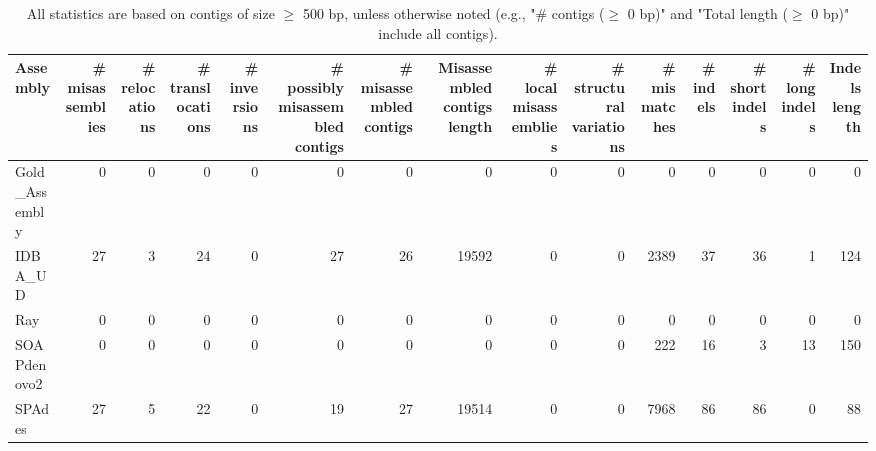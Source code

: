 \documentclass[12pt,a4paper]{article}
\begin{document}
\begin{table}[ht]
\begin{center}
\caption{All statistics are based on contigs of size $\geq$ 500 bp, unless otherwise noted (e.g., "\# contigs ($\geq$ 0 bp)" and "Total length ($\geq$ 0 bp)" include all contigs).}
\begin{tabular}{|l*{14}{|r}|}
\hline
Assembly & \# misassemblies &     \# relocations &     \# translocations &     \# inversions & \# possibly misassembled contigs & \# misassembled contigs & Misassembled contigs length & \# local misassemblies & \# structural variations & \# mismatches & \# indels &     \# short indels &     \# long indels & Indels length \\ \hline
Gold\_Assembly & 0 & 0 & 0 & 0 & 0 & 0 & 0 & 0 & 0 & 0 & 0 & 0 & 0 & 0 \\ \hline
IDBA\_UD & 27 & 3 & 24 & 0 & 27 & 26 & 19592 & 0 & 0 & 2389 & 37 & 36 & 1 & 124 \\ \hline
Ray & 0 & 0 & 0 & 0 & 0 & 0 & 0 & 0 & 0 & 0 & 0 & 0 & 0 & 0 \\ \hline
SOAPdenovo2 & 0 & 0 & 0 & 0 & 0 & 0 & 0 & 0 & 0 & 222 & 16 & 3 & 13 & 150 \\ \hline
SPAdes & 27 & 5 & 22 & 0 & 19 & 27 & 19514 & 0 & 0 & 7968 & 86 & 86 & 0 & 88 \\ \hline
\end{tabular}
\end{center}
\end{table}
\end{document}
